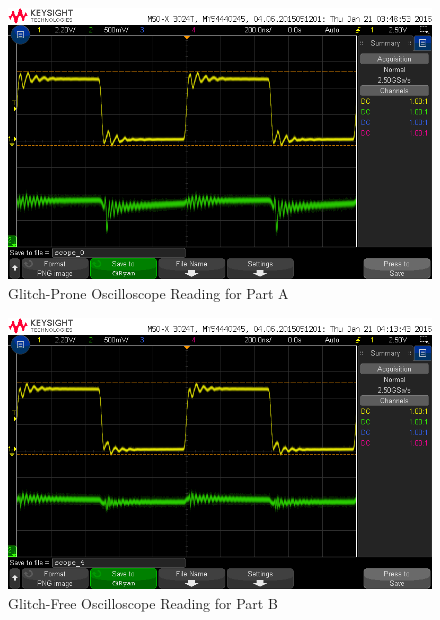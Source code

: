 \documentclass{scrartcl}
\begin{document}
	\begin{figure} [H]
		\centering
		\includegraphics[scale = 0.35]{scope_0.png}
		\caption{Glitch-Prone Oscilloscope Reading for Part A}
		\label{fig:glitch-prone-oscilloscope}
	\end{figure}

	\begin{figure} [H]
		\centering
		\includegraphics[scale = 0.35]{scope_4.png}
		\caption{Glitch-Free Oscilloscope Reading for Part B}
		\label{fig:glitch-free-oscilloscope}
	\end{figure}

\end{document}
